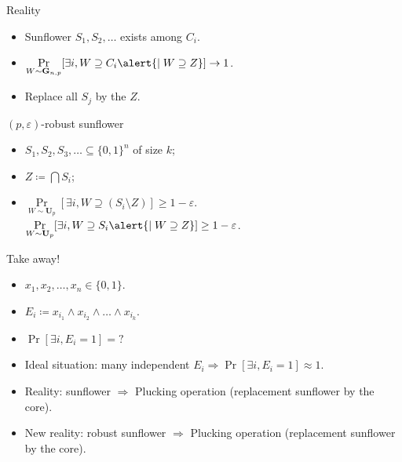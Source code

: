 \begin{frame}{Reality}

    \begin{center}
        
    \end{center}

    \begin{itemize}
        \item Sunflower $S_1, S_2, \dots$ exists among $C_i$.
            \pause
        \item $\Pr\limits_{W \sim \mathbf{G}_{n, p}}[\exists i, W \supseteq C_i \alert{\mid W \supseteq Z}] \to
            1$.
            \pause
            \pause
        \item Replace all $S_j$ by the $Z$.
    \end{itemize}


    \pause
    \vspace{0.3cm}

    \begin{block}{$(p, \varepsilon)$-robust sunflower}
        \begin{itemize}
            \item $S_1, S_2, S_3, \dots \subseteq \{0, 1\}^n$ of size $k$;
            \item $Z \coloneqq \bigcap S_i$;
            \item $\Pr\limits_{W \sim \mathbf{U}_p}[\exists i, W \supseteq (S_i \setminus Z)] \ge 1 -
                \varepsilon$. \pause
                $\Pr\limits_{W \sim \mathbf{U}_p}[\exists i, W \supseteq S_i \alert{\mid W \supseteq Z}]
                \ge 1 - \varepsilon$. 
        \end{itemize}
    \end{block}

\end{frame}


\begin{frame}{Take away!}

    \begin{itemize}
        \item $x_1, x_2, \dots, x_n \in \{0, 1\}$.
        \item $E_i \coloneqq x_{i_1} \land x_{i_2} \land \dots \land x_{i_k}$.
        \item $\Pr[\exists i, E_i = 1] = ?$
            \pause
        \item Ideal situation: many independent $E_i \Rightarrow \Pr[\exists i, E_i = 1] \approx 1$.
            \pause
        \item Reality: sunflower $\Rightarrow$ Plucking operation (replacement sunflower by the core).
            \pause
        \item New reality: robust sunflower $\Rightarrow$ Plucking operation (replacement sunflower by
            the core).
    \end{itemize}
    
\end{frame}